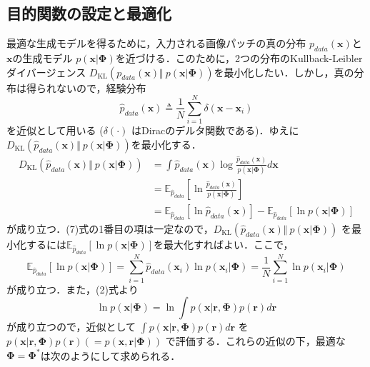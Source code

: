 \subsection{目的関数の設定と最適化}
最適な生成モデルを得るために，入力される画像パッチの真の分布 $p_{data}(\mathbf{x})$と$\mathbf{x}$の生成モデル $p(\mathbf{x}|\mathbf{\Phi})$を近づける．このために，2つの分布のKullback-Leibler ダイバージェンス $D_{\text{KL}}\left(p_{data}(\mathbf{x}) \Vert\ p(\mathbf{x}|\mathbf{\Phi})\right)$を最小化したい．しかし，真の分布は得られないので，経験分布 
\begin{equation}
\hat{p}_{data}(\mathbf{x})\triangleq\frac{1}{N}\sum_{i=1}^N \delta(\mathbf{x}-\mathbf{x}_i)
\end{equation}
を近似として用いる ($\delta(\cdot)$ はDiracのデルタ関数である)．ゆえに$D_{\text{KL}}\left(\hat{p}_{data}(\mathbf{x}) \Vert\ p(\mathbf{x}|\mathbf{\Phi})\right)$を最小化する．
\begin{align}
D_{\text{KL}}\left(\hat{p}_{data}(\mathbf{x}) \Vert\ p(\mathbf{x}|\mathbf{\Phi})\right)&=\int \hat{p}_{data}(\mathbf{x}) \log \frac{\hat{p}_{data}(\mathbf{x})}{p(\mathbf{x}|\mathbf{\Phi})} d\mathbf{x}\\
&=\mathbb{E}_{\hat{p}_{data}} \left[\ln \frac{\hat{p}_{data}(\mathbf{x})}{p(\mathbf{x}|\mathbf{\Phi})}\right]\\
&=\mathbb{E}_{\hat{p}_{data}} \left[\ln \hat{p}_{data}(\mathbf{x})\right]-\mathbb{E}_{\hat{p}_{data}} \left[\ln p(\mathbf{x}|\mathbf{\Phi})\right]
\end{align}
が成り立つ．(7)式の1番目の項は一定なので，$D_{\text{KL}}\left(\hat{p}_{data}(\mathbf{x}) \Vert\ p(\mathbf{x}|\mathbf{\Phi})\right)$ を最小化するには$\mathbb{E}_{\hat{p}_{data}} \left[\ln p(\mathbf{x}|\mathbf{\Phi})\right]$を最大化すればよい．ここで，
\begin{equation}
\mathbb{E}_{\hat{p}_{data}} \left[\ln p(\mathbf{x}|\mathbf{\Phi})\right]=\sum_{i=1}^N \hat{p}_{data}(\mathbf{x}_i)\ln p(\mathbf{x}_i|\mathbf{\Phi})=\frac{1}{N}\sum_{i=1}^N \ln p(\mathbf{x}_i|\mathbf{\Phi})
\end{equation}
が成り立つ．また，(2)式より
\begin{equation}
\ln p(\mathbf{x}|\mathbf{\Phi})=\ln \int p(\mathbf{x}|\mathbf{r}, \mathbf{\Phi})p(\mathbf{r})d\mathbf{r}
\end{equation}
が成り立つので，近似として $\displaystyle \int p(\mathbf{x}|\mathbf{r}, \mathbf{\Phi})p(\mathbf{r})d\mathbf{r}$ を $p(\mathbf{x}|\mathbf{r}, \mathbf{\Phi})p(\mathbf{r}) \left(=p(\mathbf{x}, \mathbf{r}| \mathbf{\Phi})\right)$ で評価する．これらの近似の下，最適な$\mathbf{\Phi}=\mathbf{\Phi}^*$は次のようにして求められる．
